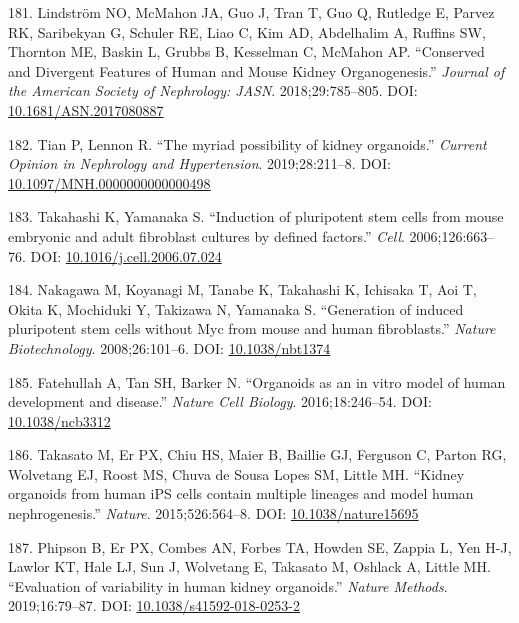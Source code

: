 \documentclass[11pt,a4paper,titlepage,twoside,openright]{style/unimelbthesis}
\theoremstyle{definition}
\theoremstyle{definition}
\theoremstyle{definition}
\theoremstyle{remark}
\begin{document}
\begin{mainmatter}
\leavevmode\hypertarget{ref-Lindstrom2018-tj}{}%
181. Lindström NO, McMahon JA, Guo J, Tran T, Guo Q, Rutledge E, Parvez RK, Saribekyan G, Schuler RE, Liao C, Kim AD, Abdelhalim A, Ruffins SW, Thornton ME, Baskin L, Grubbs B, Kesselman C, McMahon AP. ``Conserved and Divergent Features of Human and Mouse Kidney Organogenesis.'' \emph{Journal of the American Society of Nephrology: JASN}. 2018;29:785--805. DOI: \href{https://doi.org/10.1681/ASN.2017080887}{10.1681/ASN.2017080887}

\leavevmode\hypertarget{ref-Tian2019-rv}{}%
182. Tian P, Lennon R. ``The myriad possibility of kidney organoids.'' \emph{Current Opinion in Nephrology and Hypertension}. 2019;28:211--8. DOI: \href{https://doi.org/10.1097/MNH.0000000000000498}{10.1097/MNH.0000000000000498}

\leavevmode\hypertarget{ref-Takahashi2006-ho}{}%
183. Takahashi K, Yamanaka S. ``Induction of pluripotent stem cells from mouse embryonic and adult fibroblast cultures by defined factors.'' \emph{Cell}. 2006;126:663--76. DOI: \href{https://doi.org/10.1016/j.cell.2006.07.024}{10.1016/j.cell.2006.07.024}

\leavevmode\hypertarget{ref-Nakagawa2008-bx}{}%
184. Nakagawa M, Koyanagi M, Tanabe K, Takahashi K, Ichisaka T, Aoi T, Okita K, Mochiduki Y, Takizawa N, Yamanaka S. ``Generation of induced pluripotent stem cells without Myc from mouse and human fibroblasts.'' \emph{Nature Biotechnology}. 2008;26:101--6. DOI: \href{https://doi.org/10.1038/nbt1374}{10.1038/nbt1374}

\leavevmode\hypertarget{ref-Fatehullah2016-qw}{}%
185. Fatehullah A, Tan SH, Barker N. ``Organoids as an in vitro model of human development and disease.'' \emph{Nature Cell Biology}. 2016;18:246--54. DOI: \href{https://doi.org/10.1038/ncb3312}{10.1038/ncb3312}

\leavevmode\hypertarget{ref-Takasato2015-zn}{}%
186. Takasato M, Er PX, Chiu HS, Maier B, Baillie GJ, Ferguson C, Parton RG, Wolvetang EJ, Roost MS, Chuva de Sousa Lopes SM, Little MH. ``Kidney organoids from human iPS cells contain multiple lineages and model human nephrogenesis.'' \emph{Nature}. 2015;526:564--8. DOI: \href{https://doi.org/10.1038/nature15695}{10.1038/nature15695}

\leavevmode\hypertarget{ref-Phipson2019-er}{}%
187. Phipson B, Er PX, Combes AN, Forbes TA, Howden SE, Zappia L, Yen H-J, Lawlor KT, Hale LJ, Sun J, Wolvetang E, Takasato M, Oshlack A, Little MH. ``Evaluation of variability in human kidney organoids.'' \emph{Nature Methods}. 2019;16:79--87. DOI: \href{https://doi.org/10.1038/s41592-018-0253-2}{10.1038/s41592-018-0253-2}


\end{mainmatter}
\end{document}
